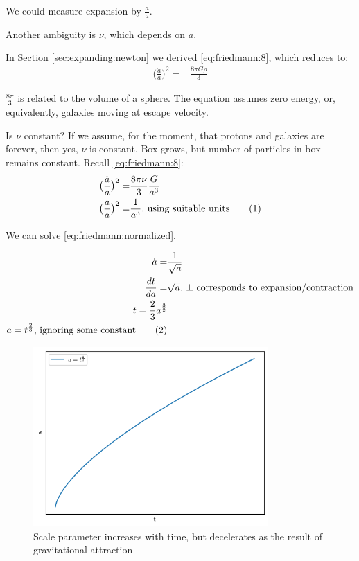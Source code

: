 \documentclass[]{article}
\newcommand\numberthis{\addtocounter{equation}{1}\tag{\theequation}}
\begin{document}
We could measure expansion by $\frac{\dot{a}}{a}$.

Another ambiguity is $\nu$, which depends on $a$.

In Section \ref{sec:expanding:newton} we derived \eqref{eq:friedmann:8}, which reduces to:
\begin{align*}
	\big(\frac{\dot{a}}{a}\big)^2 =& \frac{8 \pi G \rho}{3}
\end{align*}

$\frac{8 \pi}{3}$ is related to the volume of a sphere. The equation assumes zero energy, or, equivalently, galaxies moving at escape velocity.

Is $\nu$ constant? If we assume, for the moment, that protons and galaxies are forever, then yes, $\nu$ is constant. Box grows, but number of particles in box remains constant. Recall \eqref{eq:friedmann:8}:
\begin{align*}
	\big(\frac{\dot{a}}{a}\big)^2 =& \frac{8 \pi \nu}{3}\frac{G}{a^3} \\
	\big(\frac{\dot{a}}{a}\big)^2 =& \frac{1}{a^3} \text{, using suitable units} \numberthis \label{eq:friedmann:normalized}
\end{align*}

We can solve \eqref{eq:friedmann:normalized}.

\begin{align*}
	\dot{a} =& \frac{1}{\sqrt{a}}\\
	\frac{dt}{da} =& \sqrt{a} \text{, $\pm$ corresponds to expansion/contraction} \\
	t = \frac{2}{3}a^{\frac{3}{2}}\\
	a = t^\frac{2}{3} \text{, ignoring some constant} \numberthis \label{eq:2:3}
\end{align*}

\begin{figure}
	\caption[Decelerating growth of scale parameter]{Scale parameter increases with time, but decelerates as the result of gravitational attraction}
	\includegraphics[width=0.8\textwidth]{figs/cosmo-2-a-t}
\end{figure}
\end{document}
